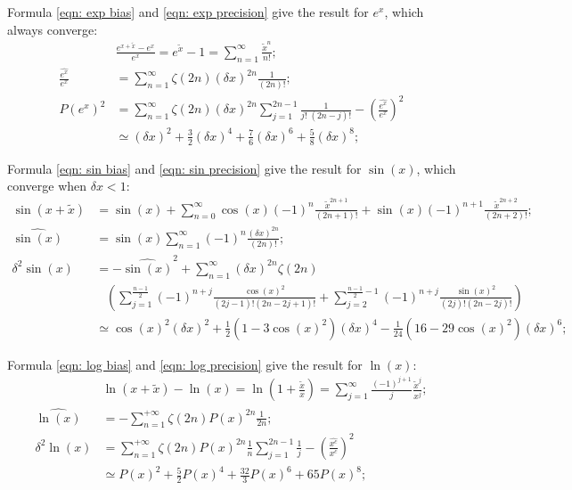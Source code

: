 \documentclass[twoside]{article}
\numberwithin{equation}{section}
\newcommand{\eqspace}{\;\;\;}
\begin{document}
Formula \eqref{eqn: exp bias} and \eqref{eqn: exp precision} give the result for $e^x$, which always converge:
\begin{align}
\label{eqn: exp Taylor}
&\frac{e^{x + \tilde{x}} - e^x}{e^x} = e^{\tilde{x}} - 1 = \sum_{n=1}^{\infty} \frac{\tilde{x}^n}{n!}; \\
\label{eqn: exp bias}
\frac{\widehat{e^x}}{e^x} &= \sum_{n=1}^{\infty} \zeta(2n) (\delta x)^{2n} \frac{1}{(2n)!}; \\
\label{eqn: exp precision}
P(e^x)^2 &= \sum_{n=1}^{\infty} \zeta(2n) (\delta x)^{2n} \sum_{j=1}^{2n-1} \frac{1}{j!\;(2n - j)!} - \left( \frac{\widehat{e^x}}{e^x} \right)^2 \\
 &\simeq (\delta x)^2 + \frac{3}{2} (\delta x)^4 + \frac{7}{6} (\delta x)^6 + \frac{5}{8} (\delta x)^8;
\end{align}

Formula \eqref{eqn: sin bias} and \eqref{eqn: sin precision} give the result for $\sin(x)$, which converge when $\delta x < 1$:
\begin{align}
\label{eqn: sin Taylor}
\sin(x + \tilde{x}) &= \sin(x) + \sum_{n=0}^{\infty} \cos(x) (-1)^n \frac{\tilde{x}^{2n+1}}{(2n + 1)!} + \sin(x) (-1)^{n+1} \frac{\tilde{x}^{2n+2}}{(2n + 2)!}; \\
\label{eqn: sin bias}
\widehat{\sin(x)} &= \sin(x) \sum_{n=1}^{\infty} (-1)^{n} \frac{(\delta x)^{2n}}{(2n)!}; \\
\label{eqn: sin precision}
\delta^2 \sin(x) &= - \widehat{\sin(x)}^2 + \sum_{n=1}^{\infty} (\delta x)^{2n} \zeta(2n) \nonumber \\
 &\eqspace \left( \sum_{j=1}^{\frac{n-1}{2}} (-1)^{n+j} \frac{\cos(x)^2}{(2j-1)!(2n-2j+1)!} 
  + \sum_{j=2}^{\frac{n-1}{2}-1} (-1)^{n+j} \frac{\sin(x)^2}{(2j)!(2n-2j)!} \right)  \\
 &\simeq \cos(x)^2 (\delta x)^2 + \frac{1} {2}(1 - 3 \cos(x)^2) (\delta x)^4 - \frac{1}{24} (16 - 29 \cos(x)^2) (\delta x)^6;
\end{align}

Formula \eqref{eqn: log bias} and \eqref{eqn: log precision} give the result for $\ln(x)$:
\begin{align}
\label{eqn: log Taylor}
& \ln(x + \tilde{x}) - \ln(x) = \ln(1 + \frac{\tilde{x}}{x}) = \sum_{j=1}^{\infty} \frac{(-1)^{j+1}}{j} \frac{\tilde{x}^j}{x^j}; \\
\label{eqn: log bias}
\widehat{\ln(x)} &= -\sum_{n=1}^{+\infty} \zeta(2n) P(x)^{2n} \frac{1}{2n}; \\
\label{eqn: log precision}
\delta^2 \ln(x) &= \sum_{n=1}^{+\infty} \zeta(2n) P(x)^{2n} \frac{1}{n} \sum_{j=1}^{2n-1} \frac{1}{j} - \left(\frac{\widehat{x^c}}{x^c}\right)^2 \\
 &\simeq P(x)^2 + \frac{5}{2} P(x)^4 + \frac{32}{3} P(x)^6 + 65 P(x)^8; 
\end{align}
\end{document}
